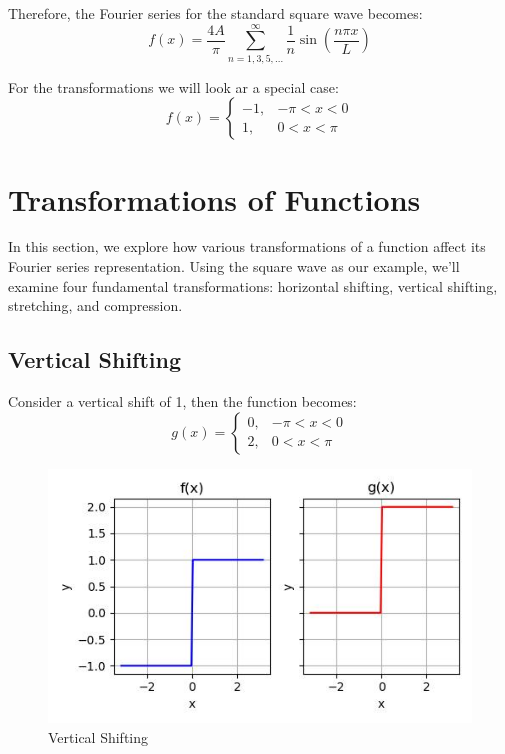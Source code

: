 \documentclass{article}
\begin{document}
Therefore, the Fourier series for the standard square wave becomes:
\begin{equation}
    f(x) = \frac{4A}{\pi} \sum_{n=1,3,5,...}^{\infty} \frac{1}{n} \sin\left(\frac{n\pi x}{L}\right)
    \end{equation}

For the transformations we will look ar a special case:
\begin{equation}
f(x) = 
\begin{cases} 
-1, & -\pi < x < 0 \\
1, & 0 < x < \pi
\end{cases}
\end{equation}

\section{Transformations of Functions}

In this section, we explore how various transformations of a function affect its Fourier series representation. Using the square wave as our example, we'll examine four fundamental transformations: horizontal shifting, vertical shifting, stretching, and compression.

\subsection{Vertical Shifting}
    
Consider a vertical shift of 1, then the function becomes:
\begin{equation}
g(x) = 
\begin{cases} 
0, & -\pi < x < 0 \\
2, & 0 < x < \pi
\end{cases}
\end{equation}


\begin{figure}
        \centering
        \includegraphics[width=\textwidth]{vertical_shift.jpg}
        \caption{Vertical Shifting}
        \label{fig:enter-label}
    \end{figure}
\end{document}
